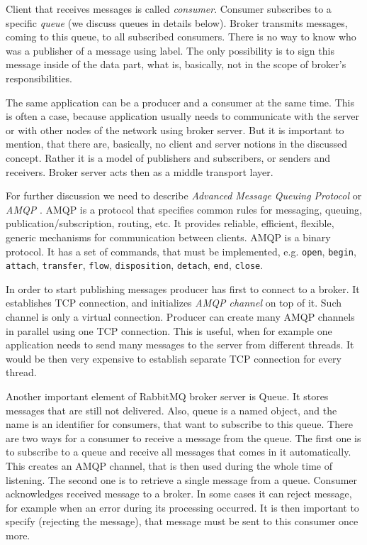 Client that receives messages is called \textit{consumer}.
Consumer subscribes to a specific \textit{queue} (we discuss queues in details below).
Broker transmits messages, coming to this queue, to all subscribed consumers.
There is no way to know who was a publisher of a message using label.
The only possibility is to sign this message inside of the data part, what is, basically, not in the scope of broker's responsibilities.

The same application can be a producer and a consumer at the same time.
This is often a case, because application usually needs to communicate with the server or with other nodes of the network using broker server.
But it is important to mention, that there are, basically, no client and server notions in the discussed concept.
Rather it is a model of publishers and subscribers, or senders and receivers.
Broker server acts then as a middle transport layer.

For further discussion we need to describe \textit{Advanced Message Queuing Protocol}  or \textit{AMQP} \cite{AMQP2011}.
AMQP is a protocol that specifies common rules for messaging, queuing, publication/subscription, routing, etc.
It provides reliable, efficient, flexible, generic mechanisms for communication between clients.
AMQP is a binary protocol.
It has a set of commands, that must be implemented, e.g. \lstinline{open}, \lstinline{begin}, \lstinline{attach}, \lstinline{transfer}, \lstinline{flow}, \lstinline{disposition}, \lstinline{detach}, \lstinline{end}, \lstinline{close}.

In order to start publishing messages producer has first to connect to a broker.
It establishes TCP connection, and initializes \textit{AMQP channel}  on top of it.
Such channel is only a virtual connection.
Producer can create many AMQP channels in parallel using one TCP connection.
This is useful, when for example one application needs to send many messages to the server from different threads.
It would be then very expensive to establish separate TCP connection for every thread.

Another important element of RabbitMQ broker server is Queue.
It stores messages that are still not delivered.
Also, queue is a named object, and the name is an identifier for consumers, that want to subscribe to this queue.
There are two ways for a consumer to receive a message from the queue.
The first one is to subscribe to a queue and receive all messages that comes in it automatically.
This creates an AMQP channel, that is then used during the whole time of listening.
The second one is to retrieve a single message from a queue.
Consumer acknowledges received message to a broker.
In some cases it can reject message, for example when an error during its processing occurred.
It is then important to specify (rejecting the message), that message must be sent to this consumer once more.


